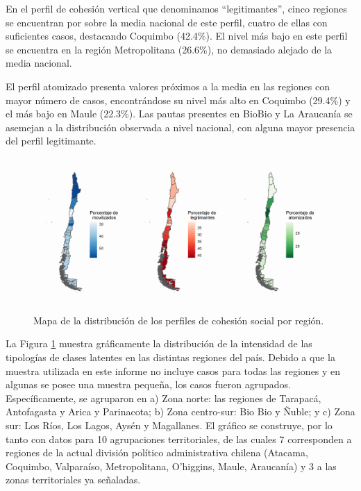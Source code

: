 \documentclass[
  12pt,
]{book}
\begin{document}
En el perfil de cohesión vertical que denominamos ``legitimantes'', cinco regiones se encuentran por sobre la media nacional de este perfil, cuatro de ellas con suficientes casos, destacando Coquimbo (42.4\%). El nivel más bajo en este perfil se encuentra en la región Metropolitana (26.6\%), no demasiado alejado de la media nacional.

El perfil atomizado presenta valores próximos a la media en las regiones con mayor número de casos, encontrándose su nivel más alto en Coquimbo (29.4\%) y el más bajo en Maule (22.3\%). Las pautas presentes en BioBio y La Araucanía se asemejan a la distribución observada a nivel nacional, con alguna mayor presencia del perfil legitimante.

\begin{figure}[H]

{\centering \includegraphics[width=1\linewidth,height=1\textheight]{output/graphs/mapas_region} 

}

\caption{Mapa de la distribución de los perfiles de cohesión social por región.}\label{fig:mapas-region}
\end{figure}

La Figura \ref{fig:mapas-region} muestra gráficamente la distribución de la intensidad de las tipologías de clases latentes en las distintas regiones del país. Debido a que la muestra utilizada en este informe no incluye casos para todas las regiones y en algunas se posee una muestra pequeña, los casos fueron agrupados. Específicamente, se agruparon en a) Zona norte: las regiones de Tarapacá, Antofagasta y Arica y Parinacota; b) Zona centro-sur: Bio Bio y Ñuble; y c) Zona sur: Los Ríos, Los Lagos, Aysén y Magallanes. El gráfico se construye, por lo tanto con datos para 10 agrupaciones territoriales, de las cuales 7 corresponden a regiones de la actual división político administrativa chilena (Atacama, Coquimbo, Valparaíso, Metropolitana, O'higgins, Maule, Araucanía) y 3 a las zonas territoriales ya señaladas.
\end{document}
